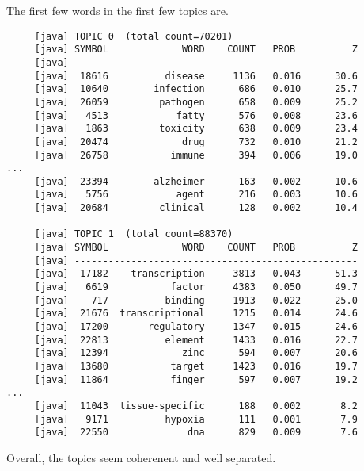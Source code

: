 The first few words in the first few topics are.
%
\begin{verbatim}
     [java] TOPIC 0  (total count=70201)
     [java] SYMBOL             WORD    COUNT   PROB          Z
     [java] --------------------------------------------------
     [java]  18616          disease     1136   0.016      30.6
     [java]  10640        infection      686   0.010      25.7
     [java]  26059         pathogen      658   0.009      25.2
     [java]   4513            fatty      576   0.008      23.6
     [java]   1863         toxicity      638   0.009      23.4
     [java]  20474             drug      732   0.010      21.2
     [java]  26758           immune      394   0.006      19.0
...
     [java]  23394        alzheimer      163   0.002      10.6
     [java]   5756            agent      216   0.003      10.6
     [java]  20684         clinical      128   0.002      10.4

     [java] TOPIC 1  (total count=88370)
     [java] SYMBOL             WORD    COUNT   PROB          Z
     [java] --------------------------------------------------
     [java]  17182    transcription     3813   0.043      51.3
     [java]   6619           factor     4383   0.050      49.7
     [java]    717          binding     1913   0.022      25.0
     [java]  21676  transcriptional     1215   0.014      24.6
     [java]  17200       regulatory     1347   0.015      24.6
     [java]  22813          element     1433   0.016      22.7
     [java]  12394             zinc      594   0.007      20.6
     [java]  13680           target     1423   0.016      19.7
     [java]  11864           finger      597   0.007      19.2
...
     [java]  11043  tissue-specific      188   0.002       8.2
     [java]   9171          hypoxia      111   0.001       7.9
     [java]  22550              dna      829   0.009       7.6
\end{verbatim}
%
Overall, the topics seem coherenent and well separated.  

